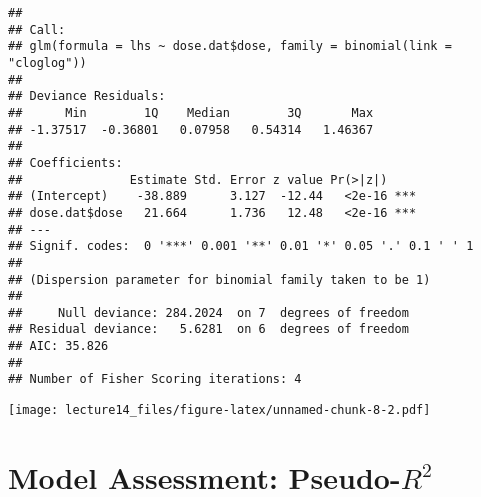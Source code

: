 \documentclass[
]{article}
\newenvironment{Shaded}{\begin{snugshade}}{\end{snugshade}}
\newcommand{\AttributeTok}[1]{\textcolor[rgb]{0.77,0.63,0.00}{#1}}
\newcommand{\FunctionTok}[1]{\textcolor[rgb]{0.00,0.00,0.00}{#1}}
\newcommand{\NormalTok}[1]{#1}
\newcommand{\SpecialCharTok}[1]{\textcolor[rgb]{0.00,0.00,0.00}{#1}}
\newcommand{\StringTok}[1]{\textcolor[rgb]{0.31,0.60,0.02}{#1}}
\begin{document}
\begin{verbatim}
## 
## Call:
## glm(formula = lhs ~ dose.dat$dose, family = binomial(link = "cloglog"))
## 
## Deviance Residuals: 
##      Min        1Q    Median        3Q       Max  
## -1.37517  -0.36801   0.07958   0.54314   1.46367  
## 
## Coefficients:
##               Estimate Std. Error z value Pr(>|z|)    
## (Intercept)    -38.889      3.127  -12.44   <2e-16 ***
## dose.dat$dose   21.664      1.736   12.48   <2e-16 ***
## ---
## Signif. codes:  0 '***' 0.001 '**' 0.01 '*' 0.05 '.' 0.1 ' ' 1
## 
## (Dispersion parameter for binomial family taken to be 1)
## 
##     Null deviance: 284.2024  on 7  degrees of freedom
## Residual deviance:   5.6281  on 6  degrees of freedom
## AIC: 35.826
## 
## Number of Fisher Scoring iterations: 4
\end{verbatim}

\begin{Shaded}
\end{Shaded}

\texttt{[image: lecture14\_files/figure-latex/unnamed-chunk-8-2.pdf]}

\hypertarget{model-assessment-pseudo-r2}{%
\section{\texorpdfstring{Model Assessment:
Pseudo-\(R^2\)}{Model Assessment: Pseudo-R\^{}2}}\label{model-assessment-pseudo-r2}}
\end{document}
